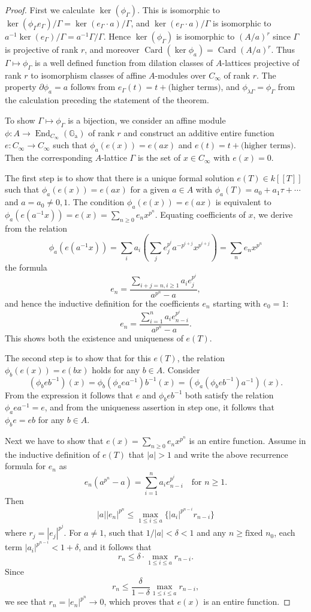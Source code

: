 \documentclass[12pt,a4paper]{article}
\theoremstyle{plain}
\theoremstyle{definition}
\theoremstyle{remark}
\DeclareMathOperator{\End}{End}
\DeclareMathOperator{\Card}{Card}
\newcommand{\Ga}{\mathbb{G}_\mathrm{a}}
\providecommand{\Ga}{\mathbb{G}_{\mathrm a}}
\providecommand{\End}{\operatorname{End}}
\begin{document}
\begin{proof}
First we calculate $\ker(\phi_\Gamma)$. This is isomorphic to $\ker(\phi_\Gamma e_\Gamma)/\Gamma = \ker(e_\Gamma \cdot a)/\Gamma$, and $\ker(e_\Gamma \cdot a)/\Gamma$ is isomorphic to $a^{-1} \ker(e_\Gamma)/\Gamma = a^{-1} \Gamma/\Gamma$. Hence $\ker(\phi_\Gamma)$ is isomorphic to $(A/a)^r$ since $\Gamma$ is projective of rank $r$, and moreover $\Card(\ker \phi_a) = \Card(A/a)^r$. Thus $\Gamma \mapsto \phi_\Gamma$ is a well defined function from dilation classes of $A$-lattices projective of rank $r$ to isomorphism classes of affine $A$-modules over $C_\infty$ of rank $r$. The property $\partial \phi_a = a$ follows from $e_\Gamma(t) = t + \text{(higher terms)}$, and $\phi_{\lambda\Gamma} = \phi_\Gamma$ from the calculation preceding the statement of the theorem.

To show $\Gamma \mapsto \phi_\Gamma$ is a bijection, we consider an affine module $\phi: A \to \End_{C_\infty}(\Ga)$ of rank $r$ and construct an additive entire function $e: C_\infty \to C_\infty$ such that $\phi_a(e(x)) = e(ax)$ and $e(t) = t + \text{(higher terms)}$. Then the corresponding $A$-lattice $\Gamma$ is the set of $x \in C_\infty$ with $e(x) = 0$.

The first step is to show that there is a unique formal solution $e(T) \in k[[T]]$ such that $\phi_a(e(x)) = e(ax)$ for a given $a \in A$ with $\phi_a(T) = a_0 + a_1 \tau + \cdots$ and $a = a_0 \neq 0, 1$. The condition $\phi_a(e(x)) = e(ax)$ is equivalent to $\phi_a(e(a^{-1} x)) = e(x) = \sum_{n \geq 0} e_n x^{p^n}$. Equating coefficients of $x$, we derive from the relation
\[
\phi_a(e(a^{-1} x)) = \sum_i a_i \left(\sum_j e_j^{p^i} a^{-p^{i+j}} x^{p^{i+j}}\right) = \sum_n e_n x^{p^n}
\]
the formula
\[
e_n = \frac{\sum_{i+j=n, i \geq 1} a_i e_j^{p^i}}{a^{p^n} - a},
\]
and hence the inductive definition for the coefficients $e_n$ starting with $e_0 = 1$:
\[
e_n = \frac{\sum_{i=1}^{n} a_i e_{n-i}^{p^i}}{a^{p^n} - a}.
\]
This shows both the existence and uniqueness of $e(T)$.

The second step is to show that for this $e(T)$, the relation $\phi_b(e(x)) = e(bx)$ holds for any $b \in A$. Consider
\[
(\phi_b e b^{-1})(x) = \phi_b(\phi_a e a^{-1}) b^{-1}(x) = (\phi_a(\phi_b e b^{-1}) a^{-1})(x).
\]
From the expression it follows that $e$ and $\phi_b e b^{-1}$ both satisfy the relation $\phi_a e a^{-1} = e$, and from the uniqueness assertion in step one, it follows that $\phi_b e = e b$ for any $b \in A$.

Next we have to show that $e(x) = \sum_{n \geq 0} e_n x^{p^n}$ is an entire function. Assume in the inductive definition of $e(T)$ that $|a| > 1$ and write the above recurrence formula for $e_n$ as
\[
e_n(a^{p^n} - a) = \sum_{i=1}^{n} a_i e_{n-i}^{p^i} \quad \text{for } n \geq 1.
\]
Then
\[
|a| |e_n|^{p^n} \leq \max_{1 \leq i \leq a} \{|a_i|^{p^{n-i}} r_{n-i}\}
\]
where $r_j = |e_j|^{p^j}$. For $a \neq 1$, such that $1/|a| < \delta < 1$ and any $n \geq \text{fixed } n_0$, each term $|a_i|^{p^{n-i}} < 1 + \delta$, and it follows that
\[
r_n \leq \delta \cdot \max_{1 \leq i \leq a} r_{n-i}.
\]
Since
\[
r_n \leq \frac{\delta}{1-\delta} \max_{1 \leq i \leq a} r_{n-i},
\]
we see that $r_n = |e_n|^{p^n} \to 0$, which proves that $e(x)$ is an entire function.


\end{proof}
\end{document}
